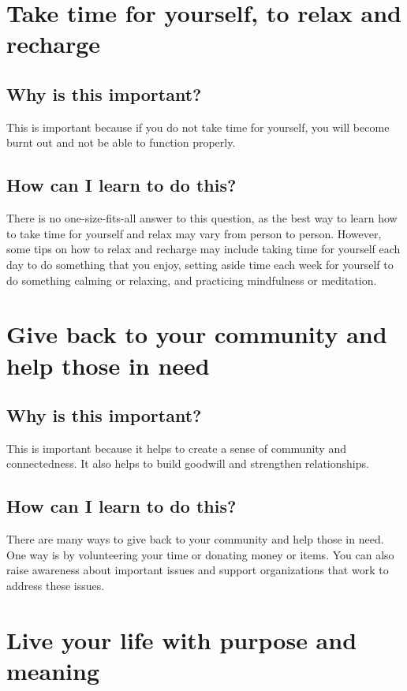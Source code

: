 \documentclass[11pt]{article}
\begin{document}
\section{Take time for yourself, to relax and recharge}
\label{sec:orgcde0413}
\subsection{Why is this important?}
\label{sec:org0ad7bc9}
This is important because if you do not take time for yourself, you will become burnt out and not be able to function properly.

\subsection{How can I learn to do this?}
\label{sec:org73786b4}
There is no one-size-fits-all answer to this question, as the best way to learn how to take time for yourself and relax may vary from person to person. However, some tips on how to relax and recharge may include taking time for yourself each day to do something that you enjoy, setting aside time each week for yourself to do something calming or relaxing, and practicing mindfulness or meditation.

\section{Give back to your community and help those in need}
\label{sec:orgfa0c132}
\subsection{Why is this important?}
\label{sec:org852c2f9}
This is important because it helps to create a sense of community and connectedness. It also helps to build goodwill and strengthen relationships.

\subsection{How can I learn to do this?}
\label{sec:org3a43004}
There are many ways to give back to your community and help those in need. One way is by volunteering your time or donating money or items. You can also raise awareness about important issues and support organizations that work to address these issues.

\section{Live your life with purpose and meaning}
\label{sec:orge398abc}
\end{document}
